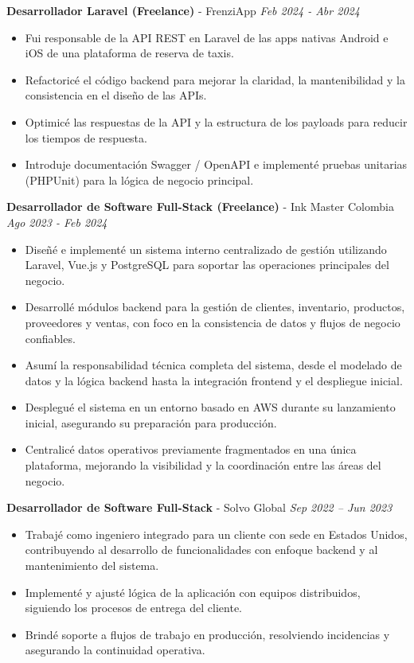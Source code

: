 \documentclass[9pt,letterpaper]{extarticle}
\begin{document}
	\textbf{Desarrollador Laravel (Freelance)} - {FrenziApp}
	\hfill \textit{Feb 2024 - Abr 2024}
	\begin{itemize}
		\item Fui responsable de la API REST en Laravel de las apps nativas Android e iOS de una plataforma de reserva de taxis.
		\item Refactoricé el código backend para mejorar la claridad, la mantenibilidad y la consistencia en el diseño de las APIs.
		\item Optimicé las respuestas de la API y la estructura de los payloads para reducir los tiempos de respuesta.
		\item Introduje documentación Swagger / OpenAPI e implementé pruebas unitarias (PHPUnit) para la lógica de negocio principal.
	\end{itemize}
	
	\textbf{Desarrollador de Software Full-Stack (Freelance)} - {Ink Master Colombia}
	\hfill \textit{Ago 2023 - Feb 2024}
	\begin{itemize}
		\item Diseñé e implementé un sistema interno centralizado de gestión utilizando Laravel, Vue.js y PostgreSQL para soportar las operaciones principales del negocio.
		\item Desarrollé módulos backend para la gestión de clientes, inventario, productos, proveedores y ventas, con foco en la consistencia de datos y flujos de negocio confiables.
		\item Asumí la responsabilidad técnica completa del sistema, desde el modelado de datos y la lógica backend hasta la integración frontend y el despliegue inicial.
		\item Desplegué el sistema en un entorno basado en AWS durante su lanzamiento inicial, asegurando su preparación para producción.
		\item Centralicé datos operativos previamente fragmentados en una única plataforma, mejorando la visibilidad y la coordinación entre las áreas del negocio.
	\end{itemize}
	
	\textbf{Desarrollador de Software Full-Stack} - {Solvo Global}
	\hfill \textit{Sep 2022 – Jun 2023}
	\begin{itemize}
		\item Trabajé como ingeniero integrado para un cliente con sede en Estados Unidos, contribuyendo al desarrollo de funcionalidades con enfoque backend y al mantenimiento del sistema.
		\item Implementé y ajusté lógica de la aplicación con equipos distribuidos, siguiendo los procesos de entrega del cliente.
		\item Brindé soporte a flujos de trabajo en producción, resolviendo incidencias y asegurando la continuidad operativa.
	\end{itemize}
	
\end{document}
